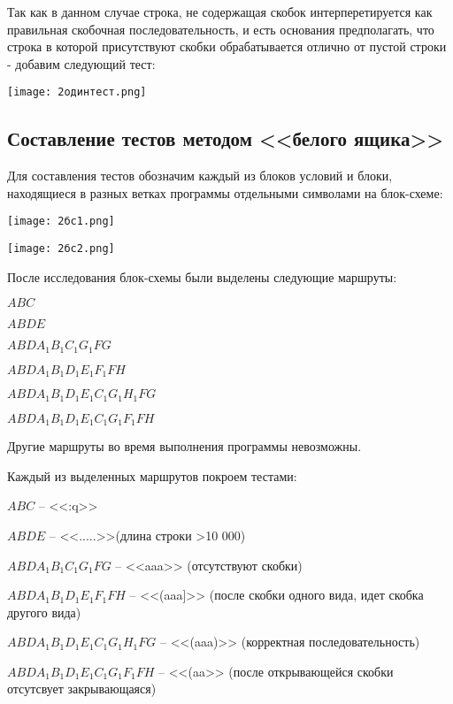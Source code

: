 \documentclass[12pt]{article}
\begin{document}
Так как в данном случае строка, не содержащая скобок интерперетируется как правильная скобочная последовательность, и есть основания предполагать, что строка в которой присутствуют скобки обрабатывается отлично от пустой строки - добавим следующий тест:




\vskip 1cm
{
    \centering
    \texttt{[image: 2одинтест.png]}
   
    \label{fig:i1}
}
\vskip 1cm


\subsection{Составление тестов методом <<белого ящика>>}


Для составления тестов обозначим каждый из блоков условий и блоки, находящиеся в разных ветках программы отдельными символами на блок-схеме:


\vskip 1cm
{
    \centering
    \texttt{[image: 2бс1.png]}
   
    \label{fig:i1}
}
\vskip 1cm
\vskip 1cm
{
    \centering
    \texttt{[image: 2бс2.png]}
   
    \label{fig:i1}
}
\vskip 1cm

После исследования блок-схемы были выделены следующие маршруты:

$
ABC 
$

$
ABDE
$

$
ABDA_1B_1C_1G_1FG
$

$
ABDA_1B_1D_1E_1F_1FH
$

$
ABDA_1B_1D_1E_1C_1G_1H_1FG
$

$
ABDA_1B_1D_1E_1C_1G_1F_1FH
$

Другие маршруты во время выполнения программы невозможны.

\vskip 1cm

Каждый из выделенных маршрутов покроем тестами:



$
ABC 
$  -- <<:q>>

$
ABDE
$ -- <<.....>>(длина строки >10 000)

$
ABDA_1B_1C_1G_1FG
$ -- <<aaa>> (отсутствуют скобки)

$
ABDA_1B_1D_1E_1F_1FH
$ -- <<(aaa]>> (после скобки одного вида, идет скобка другого вида)

$
ABDA_1B_1D_1E_1C_1G_1H_1FG
$  -- <<(aaa)>> (корректная последовательность)

$
ABDA_1B_1D_1E_1C_1G_1F_1FH
$ -- <<(aa>> (после открывающейся скобки отсутсвует закрывающаяся)
\end{document}

